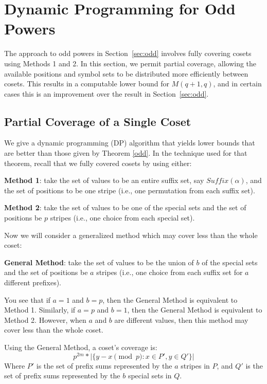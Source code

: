 
\section{Dynamic Programming for Odd Powers}
\label{sec:dp}

The approach to odd powers in Section~\ref{sec:odd} involves fully covering cosets using Methods 1 and 2. In this section, we permit partial coverage, allowing the available positions and symbol sets to be distributed more efficiently between cosets. This results in a computable lower bound for $M(q+1,q)$, and in certain cases this is an improvement over the result in Section~\ref{sec:odd}.

\subsection{Partial Coverage of a Single Coset}


We give a dynamic programming (DP) algorithm that yields lower bounds that are better than those given by Theorem \ref{odd}. In the technique used for that theorem, recall that we fully covered cosets by using either:

{\bf Method 1}: take the set of values to be an entire suffix set, say $Suffix(\alpha)$, and the set of positions to be one stripe (i.e., one permutation from each suffix set).

{\bf Method 2}: take the set of values to be one of the special sets and the set of positions be $p$ stripes (i.e., one choice from each special set).

Now we will consider a generalized method which may cover less than the whole coset:

{\bf General Method}: take the set of values to be the union of $b$ of the special sets and the set of positions be $a$ stripes (i.e., one choice from each suffix set for $a$ different prefixes).

You see that if $a=1$ and $b=p$, then the General Method is equivalent to Method 1. Similarly, if $a=p$ and $b=1$, then the General Method is equivalent to Method 2. However, when $a$ and $b$ are different values, then this method may cover less than the whole coset.

\begin{theorem}
\label{th:general coset coverage}

Using the General Method, a coset's coverage is:
$$ p^{2m} * |\{y-x \pmod p : x \in P', y \in Q'  \}|  $$
Where $P'$ is the set of prefix sums represented by the $a$ stripes in $P$, and $Q'$ is the set of prefix sums represented by the $b$ special sets in $Q$.

\end{theorem}


